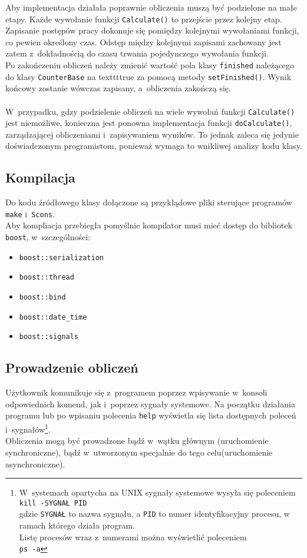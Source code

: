 \documentclass[a4paper]{article}
\begin{document}
Aby implementacja działała poprawnie obliczenia muszą być podzielone na małe etapy.
Każde wywołanie funkcji \texttt{Calculate()} to przejście przez kolejny etap.\\
Zapisanie postępów pracy dokonuje się pomiędzy kolejnymi wywołaniami funkcji, co pewien określony czas.
Odstęp między kolejnymi zapisami zachowany jest zatem z~dokładnością do czasu trwania pojedynczego wywołania funkcji.\\
Po zakończeniu obliczeń należy zmienić wartość pola klasy \texttt{finished} należącego do klasy \texttt{CounterBase} na texttt{true} za pomocą metody \texttt{setFinished()}.
Wynik końcowy zostanie wówczas zapisany, a~obliczenia zakończą się.\\
~\\
W~przypadku, gdzy podzielenie obliczeń na wiele wywołań funkcji \texttt{Calculate()} jest niemożliwe, konieczna jest ponowna implementacja funkcji \texttt{doCalculate()}, zarządzającej obliczeniami i~zapisywaniem wyników. 
To jednak zaleca się jedynie doświadczonym programistom, ponieważ wymaga to wnikliwej analizy kodu klasy.
\subsection{Kompilacja}
Do kodu źródłowego klasy dołączone są przykłądowe pliki sterujące programów \texttt{make} i~\texttt{Scons}.\\
Aby kompliacja przebiegła pomyślnie kompilator musi mieć dostęp do bibliotek \texttt{boost}, w~szczególności:
\begin{itemize}
\item \texttt{boost::serialization}
\item \texttt{boost::thread} 
\item \texttt{boost::bind}
\item \texttt{boost::date\_time}
\item \texttt{boost::signals}
\end{itemize}
\subsection{Prowadzenie obliczeń}
Użytkownik komunikuje się z~programem poprzez wpisywanie w~konsoli odpowiednich komend, jak i~poprzez sygnały systemowe. 
Na początku działania programu lub po wpisaniu polecenia \texttt{help} wyświetla się lista dostępnych poleceń i~sygnałów\footnote{W~systemach opartycha na UNIX sygnały systemowe wysyła się poleceniem\\\texttt{kill -SYGNAŁ PID}\\gdzie \texttt{SYGNAŁ} to nazwa sygnału, a \texttt{PID} to numer identyfikacyjny procesu, w ramach którego działa program.\\Listę procesów wraz z~numerami można wyświetlić poleceniem\\\texttt{ps -a}}.\\
Obliczenia mogą być prowadzone bądź w~wątku głównym (uruchomienie synchroniczne), bądź w~utworzonym specjalnie do tego celu(uruchomienie asynchroniczne).
\end{document}
